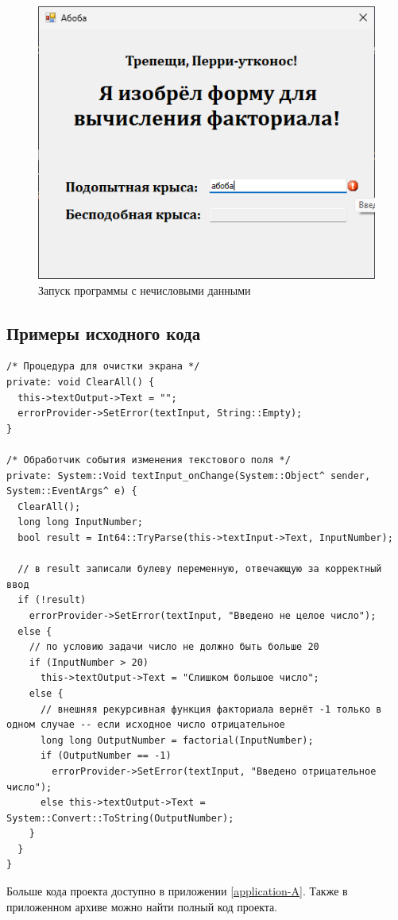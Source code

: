 \begin{figure}
  \centering
  \includegraphics[width=0.5\linewidth]{images/factorial/error2.png}
  \caption{Запуск программы с нечисловыми данными}
  \label{fig:factorial-error2}
\end{figure}

\subsection{Примеры исходного кода}
\begin{verbatim}
/* Процедура для очистки экрана */
private: void ClearAll() {
  this->textOutput->Text = "";
  errorProvider->SetError(textInput, String::Empty);
}

/* Обработчик события изменения текстового поля */
private: System::Void textInput_onChange(System::Object^ sender, System::EventArgs^ e) {
  ClearAll();
  long long InputNumber;
  bool result = Int64::TryParse(this->textInput->Text, InputNumber);

  // в result записали булеву переменную, отвечающую за корректный ввод
  if (!result)
    errorProvider->SetError(textInput, "Введено не целое число");
  else {
    // по условию задачи число не должно быть больше 20
    if (InputNumber > 20)
      this->textOutput->Text = "Слишком большое число";
    else {
      // внешняя рекурсивная функция факториала вернёт -1 только в одном случае -- если исходное число отрицательное
      long long OutputNumber = factorial(InputNumber);
      if (OutputNumber == -1)
        errorProvider->SetError(textInput, "Введено отрицательное число");
      else this->textOutput->Text = System::Convert::ToString(OutputNumber);
    }
  }
}
\end{verbatim}

Больше кода проекта доступно в приложении \ref{application-A}. Также в приложенном архиве можно найти полный код проекта.